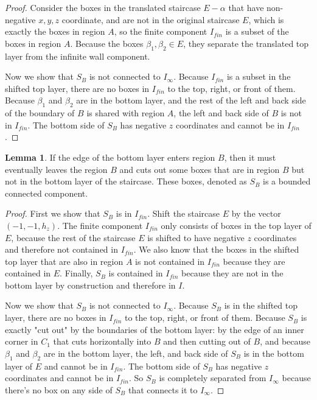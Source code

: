 \documentclass{amsart}[10pt]
\theoremstyle{plain}
\theoremstyle{definition}
\newtheorem{lemma}[theorem]{Lemma}
\begin{document}
\begin{proof}
Consider the boxes in the translated staircase $E-\alpha$ that have non-negative $x,y,z$ coordinate, and are not in the original staircase $E$, which is exactly the boxes in region $A$, so the finite component $I_{fin}$ is a subset of the boxes in region $A$. Because the boxes $\beta_1, \beta_2 \in E$, they separate the translated top layer from the infinite wall component. 

Now we show that $S_B$ is not connected to $I_\infty$. Because $I_{fin}$ is a subset in the shifted top layer, there are no boxes in $I_{fin}$ to the top, right, or front of them. Because $\beta_1$ and $\beta_2$ are in the bottom layer, and the rest of the left and back side of the boundary of $B$ is shared with region $A$, the left and back side of $B$ is not in $I_{fin}$. The bottom side of $S_B$ has negative $z$ coordinates and cannot be in $I_{fin}$.
\end{proof}


\begin{lemma}
\label{reg_B}
If the edge of the bottom layer enters region $B$, then it must eventually leaves the region $B$ and cuts out some boxes that are in region $B$ but not in the bottom layer of the staircase. These boxes, denoted as $S_B$ is a bounded connected component.
\end{lemma}

\begin{proof}
First we show that $S_B$ is in $I_{fin}$. Shift the staircase $E$ by the vector $(-1,-1, h_z)$. The finite component $I_{fin}$ only consists of boxes in the top layer of $E$, because the rest of the staircase $E$ is shifted to have negative $z$ coordinates and therefore not contained in $I_{fin}$. We also know that the boxes in the shifted top layer that are also in region $A$ is not contained in $I_{fin}$ because they are contained in $E$. Finally, $S_B$ is contained in $I_{fin}$ because they are not in the bottom layer by construction and therefore in $I$. 

Now we show that $S_B$ is not connected to $I_\infty$. Because $S_B$ is in the shifted top layer, there are no boxes in $I_{fin}$ to the top, right, or front of them. Because $S_B$ is exactly "cut out" by the boundaries of the bottom layer: by the edge of an inner corner in $C_1$ that cuts horizontally into $B$ and then cutting out of $B$, and because $\beta_1$ and $\beta_2$ are in the bottom layer, the left, and back side of $S_B$ is in the bottom layer of $E$ and cannot be in $I_{fin}$. The bottom side of $S_B$ has negative $z$ coordinates and cannot be in $I_{fin}$. So $S_B$ is completely separated from $I_\infty$ because there's no box on any side of $S_B$ that connects it to $I_\infty$.
\end{proof}
\end{document}

